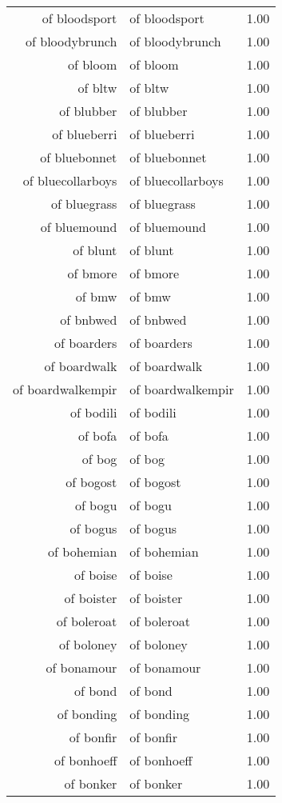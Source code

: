 \begin{table}[ht]
\begin{tabular}{rlr}
  of bloodsport & of bloodsport & 1.00 \\ 
  of bloodybrunch & of bloodybrunch & 1.00 \\ 
  of bloom & of bloom & 1.00 \\ 
  of bltw & of bltw & 1.00 \\ 
  of blubber & of blubber & 1.00 \\ 
  of blueberri & of blueberri & 1.00 \\ 
  of bluebonnet & of bluebonnet & 1.00 \\ 
  of bluecollarboys & of bluecollarboys & 1.00 \\ 
  of bluegrass & of bluegrass & 1.00 \\ 
  of bluemound & of bluemound & 1.00 \\ 
  of blunt & of blunt & 1.00 \\ 
  of bmore & of bmore & 1.00 \\ 
  of bmw & of bmw & 1.00 \\ 
  of bnbwed & of bnbwed & 1.00 \\ 
  of boarders & of boarders & 1.00 \\ 
  of boardwalk & of boardwalk & 1.00 \\ 
  of boardwalkempir & of boardwalkempir & 1.00 \\ 
  of bodili & of bodili & 1.00 \\ 
  of bofa & of bofa & 1.00 \\ 
  of bog & of bog & 1.00 \\ 
  of bogost & of bogost & 1.00 \\ 
  of bogu & of bogu & 1.00 \\ 
  of bogus & of bogus & 1.00 \\ 
  of bohemian & of bohemian & 1.00 \\ 
  of boise & of boise & 1.00 \\ 
  of boister & of boister & 1.00 \\ 
  of boleroat & of boleroat & 1.00 \\ 
  of boloney & of boloney & 1.00 \\ 
  of bonamour & of bonamour & 1.00 \\ 
  of bond & of bond & 1.00 \\ 
  of bonding & of bonding & 1.00 \\ 
  of bonfir & of bonfir & 1.00 \\ 
  of bonhoeff & of bonhoeff & 1.00 \\ 
  of bonker & of bonker & 1.00 \\ 

\end{tabular}
\end{table}
